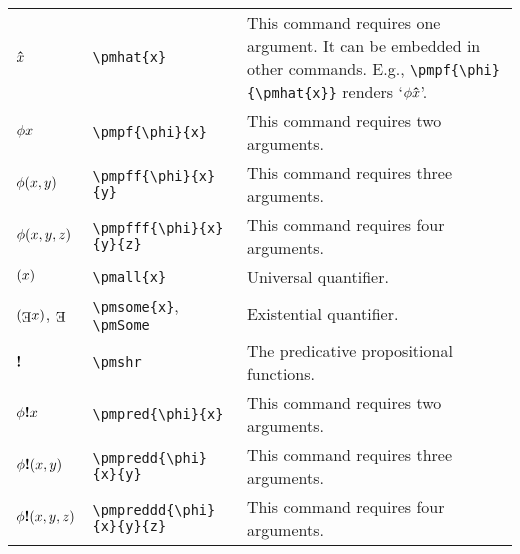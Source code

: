 \documentclass[12pt]{article}
\begin{document}
\begin{tabular}{@{}p{3cm} | p{5cm} | p{8.25cm}}
	$\mathbf{\hat{\text{$x$}}}$ & \verb|\pmhat{x}| & This command requires one argument. It can be embedded in other commands. E.g., \verb|\pmpf{\phi}{\pmhat{x}}| renders `$\phi\mathbf{\hat{\text{$x$}}}$'. \\
	$\phi x$ & \verb|\pmpf{\phi}{x}| & This command requires two arguments. \\
	$\phi(x, y)$ & \verb|\pmpff{\phi}{x}{y}| & This command requires three arguments. \\
	$\phi(x, y, z)$ & \verb|\pmpfff{\phi}{x}{y}{z}| & This command requires four arguments. \\
	$(x)$ &\verb|\pmall{x}| & Universal quantifier. \\
	$\pmsome{x}$, $\pmSome$ & \verb|\pmsome{x}|, \verb|\pmSome| & Existential quantifier. \\
	$\textbf{!}$ & \verb|\pmshr| & The predicative propositional functions. \\
	$\phi\textbf{!} x$ & \verb|\pmpred{\phi}{x}| & This command requires two arguments. \\
	$\phi\textbf{!}(x, y)$ & \verb|\pmpredd{\phi}{x}{y}| & This command requires three arguments. \\
	$\phi\textbf{!}(x, y, z)$ & \verb|\pmpreddd{\phi}{x}{y}{z}| & This command requires four arguments.
\end{tabular}
\end{document}
